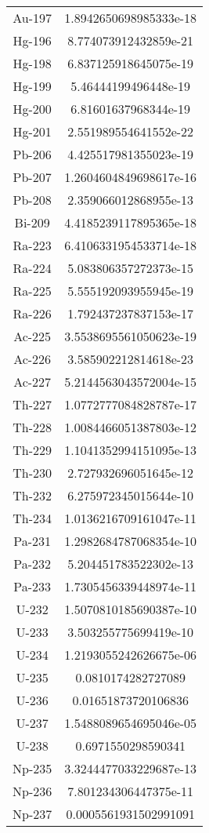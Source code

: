 \begin{table}[h!]
\begin{tabular}{|| c || c |}
Au-197 & 1.8942650698985333e-18 \\
Hg-196 & 8.774073912432859e-21 \\
Hg-198 & 6.837125918645075e-19 \\
Hg-199 & 5.46444199496448e-19 \\
Hg-200 & 6.81601637968344e-19 \\
Hg-201 & 2.551989554641552e-22 \\
Pb-206 & 4.425517981355023e-19 \\
Pb-207 & 1.2604604849698617e-16 \\
Pb-208 & 2.359066012868955e-13 \\
Bi-209 & 4.4185239117895365e-18 \\
Ra-223 & 6.4106331954533714e-18 \\
Ra-224 & 5.083806357272373e-15 \\
Ra-225 & 5.555192093955945e-19 \\
Ra-226 & 1.792437237837153e-17 \\
Ac-225 & 3.5538695561050623e-19 \\
Ac-226 & 3.585902212814618e-23 \\
Ac-227 & 5.2144563043572004e-15 \\
Th-227 & 1.0772777084828787e-17 \\
Th-228 & 1.0084466051387803e-12 \\
Th-229 & 1.1041352994151095e-13 \\
Th-230 & 2.727932696051645e-12 \\
Th-232 & 6.275972345015644e-10 \\
Th-234 & 1.0136216709161047e-11 \\
Pa-231 & 1.2982684787068354e-10 \\
Pa-232 & 5.204451783522302e-13 \\
Pa-233 & 1.7305456339448974e-11 \\
U-232 & 1.5070810185690387e-10 \\
U-233 & 3.503255775699419e-10 \\
U-234 & 1.2193055242626675e-06 \\
U-235 & 0.0810174282727089 \\
U-236 & 0.01651873720106836 \\
U-237 & 1.5488089654695046e-05 \\
U-238 & 0.6971550298590341 \\
Np-235 & 3.3244477033229687e-13 \\
Np-236 & 7.801234306447375e-11 \\
Np-237 & 0.0005561931502991091 \\

\end{tabular}
\end{table}
